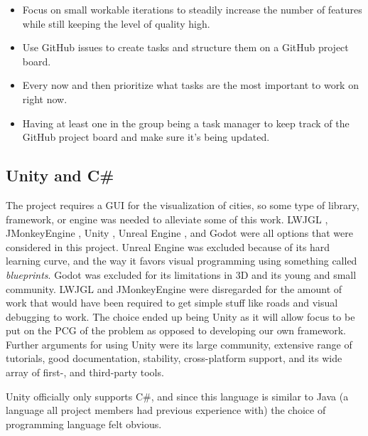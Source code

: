 \begin{itemize}
    \item Focus on small workable iterations to steadily increase the number of features while still keeping the level of quality high.  
    \item Use GitHub issues to create tasks and structure them on a GitHub project board. 
    \item Every now and then prioritize what tasks are the most important to work on right now.
    \item Having at least one in the group being a task manager to keep track of the GitHub project board and make sure it's being updated.
\end{itemize}

\subsection{Unity and C\#}
The project requires a GUI for the visualization of cities, so some type of library, framework, or engine was needed to alleviate some of this work.
LWJGL \cite{lwjgl}, JMonkeyEngine \cite{jmonkey}, Unity \cite{unity}, Unreal Engine \cite{unreal}, and Godot \cite{godot} were all options that were considered in this project.
Unreal Engine was excluded because of its hard learning curve, and the way it favors visual programming using something called \textit{blueprints}.
Godot was excluded for its limitations in 3D and its young and small community.
LWJGL and JMonkeyEngine were disregarded for the amount of work that would have been required to get simple stuff like roads and visual debugging to work.
The choice ended up being Unity as it will allow focus to be put on the PCG of the problem as opposed to developing our own framework.
Further arguments for using Unity were its large community, extensive range of tutorials, good documentation, stability, cross-platform support, and its wide array of first-, and third-party tools.

Unity officially only supports C\#, and since this language is similar to Java (a language all project members had previous experience with) the choice of programming language felt obvious.